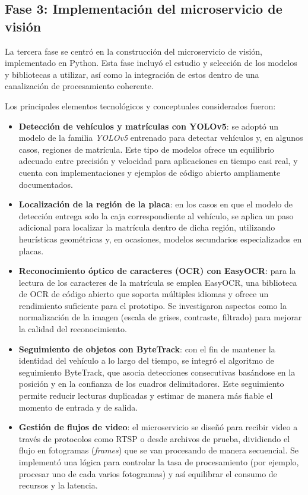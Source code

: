 \subsection{Fase 3: Implementación del microservicio de visión}

La tercera fase se centró en la construcción del microservicio de visión, implementado en Python. Esta fase incluyó el estudio y selección de los modelos y bibliotecas a utilizar, así como la integración de estos dentro de una canalización de procesamiento coherente.

Los principales elementos tecnológicos y conceptuales considerados fueron:

\begin{itemize}
    \item \textbf{Detección de vehículos y matrículas con YOLOv5}: se adoptó un modelo de la familia \textit{YOLOv5} entrenado para detectar vehículos y, en algunos casos, regiones de matrícula. Este tipo de modelos ofrece un equilibrio adecuado entre precisión y velocidad para aplicaciones en tiempo casi real, y cuenta con implementaciones y ejemplos de código abierto ampliamente documentados.
    \item \textbf{Localización de la región de la placa}: en los casos en que el modelo de detección entrega solo la caja correspondiente al vehículo, se aplica un paso adicional para localizar la matrícula dentro de dicha región, utilizando heurísticas geométricas y, en ocasiones, modelos secundarios especializados en placas.
    \item \textbf{Reconocimiento óptico de caracteres (OCR) con EasyOCR}: para la lectura de los caracteres de la matrícula se emplea EasyOCR, una biblioteca de OCR de código abierto que soporta múltiples idiomas y ofrece un rendimiento suficiente para el prototipo. Se investigaron aspectos como la normalización de la imagen (escala de grises, contraste, filtrado) para mejorar la calidad del reconocimiento.
    \item \textbf{Seguimiento de objetos con ByteTrack}: con el fin de mantener la identidad del vehículo a lo largo del tiempo, se integró el algoritmo de seguimiento ByteTrack, que asocia detecciones consecutivas basándose en la posición y en la confianza de los cuadros delimitadores. Este seguimiento permite reducir lecturas duplicadas y estimar de manera más fiable el momento de entrada y de salida.
    \item \textbf{Gestión de flujos de video}: el microservicio se diseñó para recibir video a través de protocolos como RTSP o desde archivos de prueba, dividiendo el flujo en fotogramas (\textit{frames}) que se van procesando de manera secuencial. Se implementó una lógica para controlar la tasa de procesamiento (por ejemplo, procesar uno de cada varios fotogramas) y así equilibrar el consumo de recursos y la latencia.
\end{itemize}

